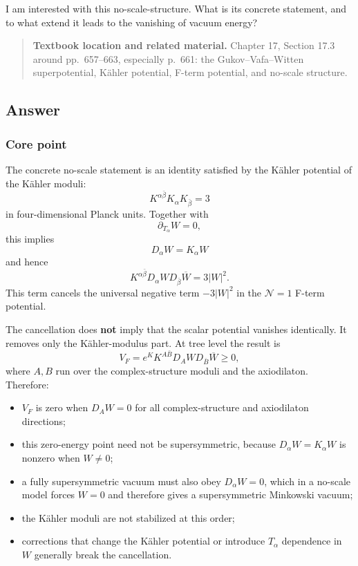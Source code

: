 \documentclass[
  10pt,
  a4paper,
  openany]{book}
\providecommand{\tightlist}{%
  \setlength{\itemsep}{0pt}\setlength{\parskip}{0pt}}
\begin{document}
I am interested with this no-scale-structure. What is its concrete
statement, and to what extend it leads to the vanishing of vacuum
energy?

\begin{quote}
\textbf{Textbook location and related material.} Chapter 17, Section
17.3 around pp.~657--663, especially p.~661: the Gukov--Vafa--Witten
superpotential, Kähler potential, F-term potential, and no-scale
structure.
\end{quote}

\subsection{Answer}\label{answer-35}

\subsubsection{Core point}\label{core-point-35}

The concrete no-scale statement is an identity satisfied by the Kähler
potential of the Kähler moduli: \[
\boxed{
K^{\alpha\bar\beta}K_\alpha K_{\bar\beta}=3
}
\] in four-dimensional Planck units. Together with \[
\partial_{T_\alpha}W=0,
\] this implies \[
D_\alpha W=K_\alpha W
\] and hence \[
K^{\alpha\bar\beta}D_\alpha W
D_{\bar\beta}\overline W
=3|W|^2.
\] This term cancels the universal negative term \(-3|W|^2\) in the
\(\mathcal N=1\) F-term potential.

The cancellation does \textbf{not} imply that the scalar potential
vanishes identically. It removes only the Kähler-modulus part. At tree
level the result is \[
\boxed{
V_F
=e^K K^{A\bar B}D_AW
D_{\bar B}\overline W
\geq0,
}
\] where \(A,B\) run over the complex-structure moduli and the
axiodilaton. Therefore:

\begin{itemize}
\tightlist
\item
  \(V_F\) is zero when \(D_AW=0\) for all complex-structure and
  axiodilaton directions;
\item
  this zero-energy point need not be supersymmetric, because
  \(D_\alpha W=K_\alpha W\) is nonzero when \(W\neq0\);
\item
  a fully supersymmetric vacuum must also obey \(D_\alpha W=0\), which
  in a no-scale model forces \(W=0\) and therefore gives a
  supersymmetric Minkowski vacuum;
\item
  the Kähler moduli are not stabilized at this order;
\item
  corrections that change the Kähler potential or introduce \(T_\alpha\)
  dependence in \(W\) generally break the cancellation.
\end{itemize}
\end{document}
